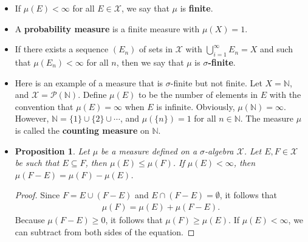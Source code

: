 \documentclass[10pt]{article}
\newtheorem{definition}[lemma]{Definition}
\newtheorem{proposition}[lemma]{Proposition}
\newcommand{\mcal}[1]{\mathcal{#1}}
\begin{document}
\begin{itemize}
  \begin{definition}
    Let $(X, \mcal{X})$ be a measurable space. A {\bf measure} is a function $\mu: \mcal{X} \rightarrow [0, \infty]$ with the following properties.
    \begin{enumerate}
      \item $\mu(\emptyset) = 0$.
      \item $\mu$ is {\bf countably additive}. That is, for a sequence $(E_n)$ of disjoint sets, it holds that
      \begin{align*}
        \mu\bigg( \bigcup_{n=1}^\infty E_n \bigg) = \sum_{n=1}^\infty \mu(E_n).
      \end{align*}
    \end{enumerate}
  \end{definition}
  
  \item If $\mu(E) < \infty$ for all $E \in \mcal{X}$, we say that $\mu$ is {\bf finite}.
  
  \item A {\bf probability measure} is a finite measure with $\mu(X) = 1$.
  
  \item If there exists a sequence $(E_n)$ of sets in $\mcal{X}$ with $\bigcup_{i=1}^\infty E_n = X$ and such that $\mu(E_n) < \infty$ for all $n$, then we say that $\mu$ is {\bf $\sigma$-finite}.
  
  \item Here is an example of a measure that is $\sigma$-finite but not finite. Let $X = \mathbb{N}$, and $\mcal{X} = \mcal{P}(\mathbb{N})$. Define $\mu(E)$ to be the number of elements in $E$ with the convention that $\mu(E) = \infty$ when $E$ is infinite. Obviously, $\mu(\mathbb{N}) = \infty$. However, $\mathbb{N} = \{ 1 \} \cup \{ 2 \} \cup \dotsb$, and $\mu(\{ n \}) = 1$ for all $n \in \mathbb{N}$. The measure $\mu$ is called the {\bf counting measure} on $\mathbb{N}$.

  \item \begin{proposition}
    Let $\mu$ be a measure defined on a $\sigma$-algebra $\mcal{X}$. Let $E, F \in \mcal{X}$ be such that $E \subseteq F$, then $\mu(E) \leq \mu(F)$. If $\mu(E) < \infty$, then $\mu(F - E) = \mu(F) - \mu(E)$.
  \end{proposition}

  \begin{proof}
    Since $F = E \cup (F - E)$ and $E \cap (F - E) = \emptyset$, it follows that
    \begin{align*}
        \mu(F) = \mu(E) + \mu(F - E).
    \end{align*}
    Because $\mu(F - E) \geq 0$, it follows that $\mu(F) \geq \mu(E)$. If $\mu(E) < \infty$, we can subtract from both sides of the equation.
  \end{proof}


\end{itemize}
\end{document}
